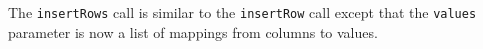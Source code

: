The \verb+insertRows+ call is similar to the \verb+insertRow+ call except that the \verb+values+ parameter
is now a list of mappings from columns to values.

